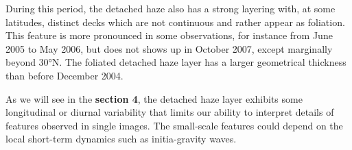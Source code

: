 During this period, the detached haze also has a strong layering with, at some latitudes, distinct decks which are not
continuous and rather appear as foliation. This feature is more pronounced in some observations, for instance from
June 2005 to May 2006, but does not shows up in October 2007, except marginally beyond \ang{30}N. The foliated detached
haze layer has a larger geometrical thickness than before December 2004.


As we will see in the \textbf{section 4}, the detached haze layer exhibits some longitudinal or diurnal variability
that limits our ability to interpret details of features observed in single images. The small-scale features
could depend on the local short-term dynamics such as initia-gravity waves.

